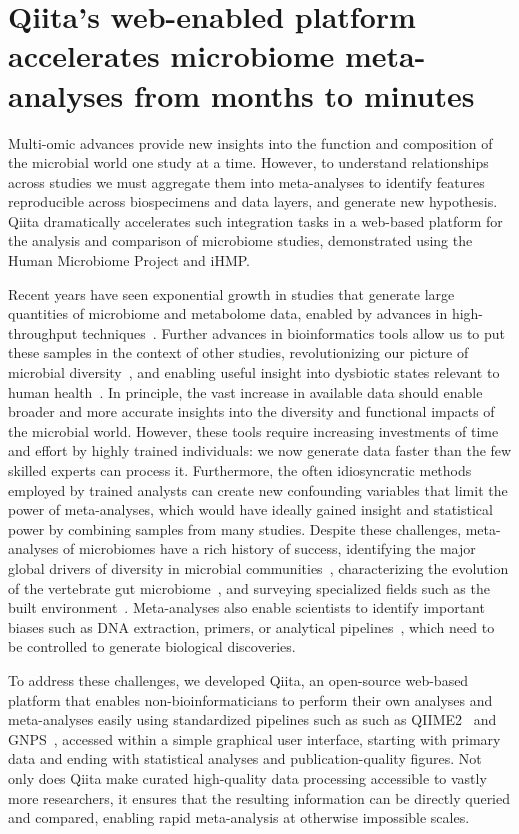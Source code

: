 \glsresetall

\section{Qiita’s web-enabled platform accelerates microbiome meta-analyses from months to minutes}\label{section_qiita}

Multi-omic advances provide new insights into the function and composition of the
microbial world one study at a time. However, to understand relationships across
studies we must aggregate them into meta-analyses to identify features reproducible
across biospecimens and data layers, and generate new hypothesis. Qiita dramatically
accelerates such integration tasks in a web-based platform for the analysis and
comparison of microbiome studies, demonstrated using the Human Microbiome Project and iHMP.

Recent years have seen exponential growth in studies that generate large quantities
of microbiome and metabolome data, enabled by advances in high-throughput techniques~\cite{Caporaso2012}.
Further advances in bioinformatics tools allow us to put these samples in the context
of other studies, revolutionizing our picture of microbial diversity~\cite{Thompson2017},
and enabling useful insight into dysbiotic states relevant to human health~\cite{Halfvarson2017}.
In principle, the vast increase in available data should enable broader and more
accurate insights into the diversity and functional impacts of the microbial world.
However, these tools require increasing investments of time and effort by highly
trained individuals: we now generate data faster than the few skilled experts can
process it. Furthermore, the often idiosyncratic methods employed by trained analysts
can create new confounding variables that limit the power of meta-analyses, which
would have ideally gained insight and statistical power by combining samples from many
studies. Despite these challenges, meta-analyses of microbiomes have a rich history of
success, identifying the major global drivers of diversity in microbial communities~\cite{Lozupone2007},
characterizing the evolution of the vertebrate gut microbiome~\cite{Ley2008Worlds},
and surveying specialized fields such as the built environment~\cite{Adams2015}.
Meta-analyses also enable scientists to identify important biases such as DNA
extraction, primers, or analytical pipelines~\cite{Debelius2016,Lozupone2013},
which need to be controlled to generate biological discoveries.

To address these challenges, we developed Qiita, an open-source web-based platform
that enables non-bioinformaticians to perform their own analyses and meta-analyses
easily using standardized pipelines such as such as QIIME2~\cite{Caporaso2010} and
GNPS~\cite{Wang2016}, accessed within a simple graphical user interface, starting
with primary data and ending with statistical analyses and publication-quality figures.
Not only does Qiita make curated high-quality data processing accessible to vastly
more researchers, it ensures that the resulting information can be directly queried
and compared, enabling rapid meta-analysis at otherwise impossible scales.

